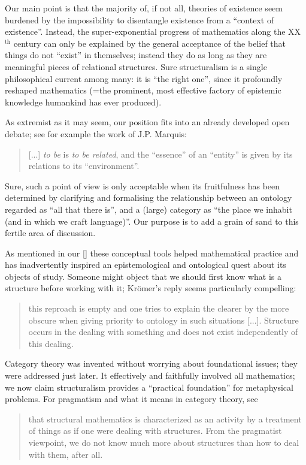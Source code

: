 \begin{itemize}
\end{itemize}
Our main point is that the majority of, if not all, theories of existence seem burdened by the impossibility to disentangle existence from a ``context of existence''. Instead, the super-exponential progress of mathematics along the XX$^\text{th}$ century can only be explained by the general acceptance of the belief that things do not ``exist'' in themselves; instead they do as long as they are meaningful pieces of relational structures. Sure structuralism is a single philosophical current among many: it is ``the right one'', since it profoundly reshaped mathematics (=the prominent, most effective factory of epistemic knowledge humankind has ever produced).

As extremist as it may seem, our position fits into an already developed open debate; see for example the work of J.P. Marquis:
\begin{quote}
	[...] \emph{to be} is \emph{to be related}, and the ``essence'' of an ``entity'' is given by its relations to its ``environment''.
	\hfill \cite{Marquis1997}
\end{quote}
Sure, such a point of view is only acceptable when its fruitfulness has been determined by clarifying and formalising the relationship between an ontology regarded as ``all that there is'', and a (large) category as ``the place we inhabit (and in which we craft language)''. Our purpose is to add a grain of sand to this fertile area of discussion.

As mentioned in our \autoref{} these conceptual tools helped mathematical practice and has inadvertently inspired an epistemological and ontological quest about its objects of study. Someone might object that we should first know what is a structure before working with it; Kr\"omer's reply seems particularly compelling:
\begin{quote}
	this reproach is empty and one tries to explain the clearer by the more obscure when giving priority to ontology in such situations [...]. Structure occurs in the dealing with something and does
	not exist independently of this dealing. \cite{kromer2007tool}
\end{quote}
Category theory was invented without worrying about foundational issues; they were addressed just later. It effectively and faithfully involved all mathematics; we now claim structuralism provides a ``practical foundation'' for metaphysical problems. For pragmatism and what it means in category theory, see
\begin{quote}
	that structural mathematics is characterized as an activity by a treatment of things as if one were dealing with structures. From the pragmatist viewpoint, we do not know much more about structures than how to deal with them, after all. \hfill \cite{kromer2007tool}
\end{quote}